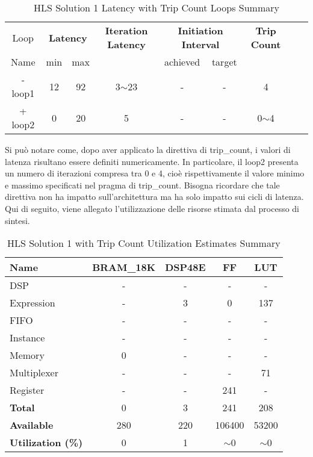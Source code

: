 \begin{table}[H]
	\centering
	\begin{tabular}{|c|c|c|c|c|c|c|c|c|}
		\hline
		\multicolumn{1}{|c|}{Loop} & \multicolumn{2}{|c|}{\textbf{Latency}} & \multicolumn{1}{c|}{\textbf{Iteration Latency}} & \multicolumn{2}{c|}{\textbf{Initiation Interval}} & \multicolumn{1}{c|}{\textbf{Trip Count}}  \\
		Name & min & max & & achieved & target &  \\
		\hline
		- loop1 & 12 & 92 & 3$\sim$23 & - & - & 4 \\
		+ loop2 & 0 & 20 & 5 & - & - & 0$\sim$4 \\
		\hline
	\end{tabular}
	\caption{HLS Solution 1 Latency with Trip Count Loops Summary }
	\label{tab:hls-solution-1-loop-summary}
\end{table}

Si può notare come, dopo aver applicato la direttiva di trip\_count, i valori di latenza risultano essere definiti numericamente. In particolare, il loop2 presenta un numero di iterazioni compresa tra 0 e 4, cioè rispettivamente il valore minimo e massimo specificati nel pragma di trip\_count. Bisogna ricordare che tale direttiva non ha impatto sull'architettura ma ha solo impatto sui cicli di latenza.
\\
Qui di seguito, viene allegato l'utilizzazione delle risorse stimata dal processo di sintesi.
\begin{table}[h]
	\centering
	\begin{tabular}{|l|c|c|c|c|}
		\hline
		\textbf{Name}    & \textbf{BRAM\_18K} & \textbf{DSP48E} & \textbf{FF} & \textbf{LUT} \\ \hline
		DSP              & -                   & -               & -           & -            \\ 
		Expression       & -                   & 3               & 0           & 137          \\ 
		FIFO             & -                   & -               & -           & -            \\ 
		Instance         & -                   & -               & -           & -            \\ 
		Memory           & 0                   & -               & -          & -            \\ 
		Multiplexer      & -                   & -               & -           & 71          \\ 
		Register         & -                   & -               & 241         & -            \\ \hline
		\textbf{Total}   & 0                   & 3               & 241         & 208          \\ \hline
		\textbf{Available} & 280               & 220             & 106400      & 53200        \\ \hline
		\textbf{Utilization (\%)} & 0            & 1               & $\sim$0     & $\sim$0      \\ \hline
	\end{tabular}
	\caption{HLS Solution 1 with Trip Count Utilization Estimates Summary}
	\label{tab:hls-solution-1-utilization-estimates-summary}
\end{table}

